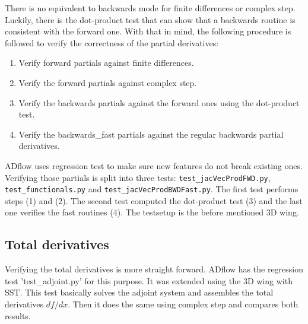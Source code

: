 \noindent There is no equivalent to backwards mode for finite differences or
complex step. Luckily, there is the dot-product test that can show that a
backwards routine is consistent with the forward one. With that in mind, the
following procedure is followed to verify the correctness of the partial
derivatives:

\begin{enumerate}
    \item Verify forward partials against finite differences.

    \item Verify the forward partials against complex step.

    \item Verify the backwards partials against the forward ones using the
        dot-product test.

    \item Verify the backwards\_fast partials against the regular backwards
        partial derivatives.
\end{enumerate}

\noindent ADflow uses regression test to make sure new features do not break
existing ones. Verifying those partials is split into three tests:
\texttt{test\_jacVecProdFWD.py}, \texttt{test\_functionals.py} and
\texttt{test\_jacVecProdBWDFast.py}. The first test performs steps (1) and (2).
The second test computed the dot-product test (3) and the last one  verifies
the fast routines (4). The testsetup is the before mentioned 3D wing.




\subsection{Total derivatives}
Verifying the total derivatives is more straight forward. ADflow has the
regression test 'test\_adjoint.py' for this purpose. It was extended using the
3D wing with SST. This test basically solves the adjoint system and assembles
the total derivatives $d f / d x$. Then it does the same using complex step and
compares both results.

